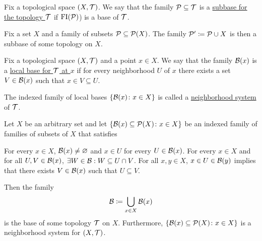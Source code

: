 \begin{definition}\label{def:topological_subbase}\cite[12]{Engelking1989}
  Fix a topological space $(X, \mathcal T)$. We say that the family $\mathcal P \subseteq \mathcal T$ is a \ul{subbase for the topology $\mathcal T$} if $\operatorname{FI}(\mathcal P)$) is a base of $\mathcal T$.
\end{definition}

\begin{proposition}
  Fix a set $X$ and a family of subsets $\mathcal P \subseteq \operatorname{\mathcal P}(X)$. The family $\mathcal P' \coloneqq \mathcal P \cup X$ is then a subbase of some topology on $X$.
\end{proposition}

\begin{definition}\label{def:topological_local_base}\cite[12]{Engelking1989}
  Fix a topological space $(X, \mathcal T)$ and a point $x \in X$. We say that the family $\mathcal B(x)$ is a \ul{local base for $\mathcal T$ at $x$} if for every neighborhood $U$ of $x$ there exists a set $V \in \mathcal B(x)$ such that $x \in V \subseteq U$.

  The indexed family of local bases $\{ \mathcal B(x) \colon x \in X \}$ is called a \ul{neighborhood system} of $\mathcal T$.
\end{definition}

\begin{proposition}\label{thm:topological_local_base_axioms}\cite[13]{Engelking1989}
  Let $X$ be an arbitrary set and let $\{ \mathcal B(x) \subseteq \operatorname{\mathcal P}(X) \colon x \in X \}$ be an indexed family of families of subsets of $X$ that satisfies
  \begin{description}
     For every $x \in X$, $\mathcal B(x) \neq \varnothing$ and $x \in U$ for every $U \in \mathcal B(x)$.
     For every $x \in X$ and for all $U, V \in \mathcal B(x)$, $\exists W \in \mathcal B: W \subseteq U \cap V$.
     For all $x, y \in X$, $x \in U \in \mathcal B(y)$ implies that there exists $V \in \mathcal B(x)$ such that $U \subseteq V$.
  \end{description}

  Then the family
  \begin{align*}
    \mathcal B \coloneqq \bigcup_{x \in X} \mathcal B(x)
  \end{align*}
  is the base of some topology $\mathcal T$ on $X$. Furthermore, $\{ \mathcal B(x) \subseteq \operatorname{\mathcal P}(X) \colon x \in X \}$ is a neighborhood system for $(X, \mathcal T)$.
\end{proposition}

